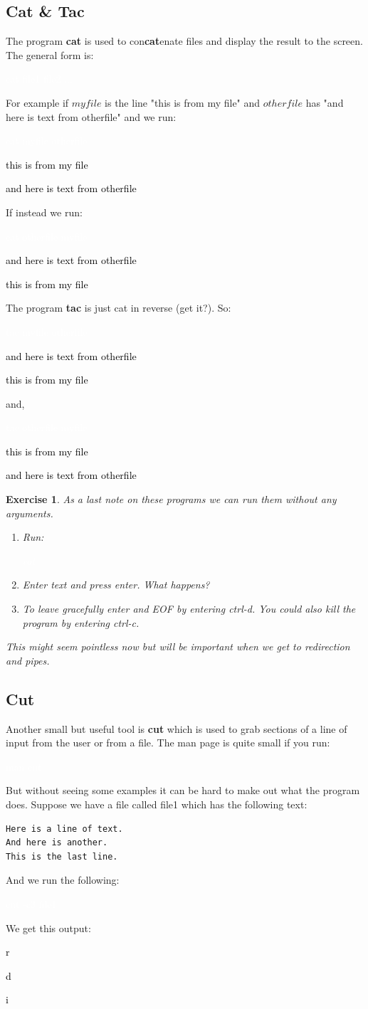 \documentclass[oneside]{book}
\newcommand{\commandline}[1]{\begin{center} \colorbox{Dark}{\textcolor{white}{#1}} \end{center}}
\newcommand{\exampleout}[1]{\begin{center} \colorbox{Light}{\textcolor{black}{#1}} \end{center}}
\newtheorem{ex}{Exercise}[chapter]
\begin{document}
\subsection{Cat \& Tac}
    The program \textbf{cat} is used to con\textbf{cat}enate files and display the result to the screen. The general form is:
    \commandline{cat file1 file2 ...}
    For example if $myfile$ is the line "this is from my file" and $otherfile$ has "and here is text from otherfile" and we run:
    \commandline{cat myfile otherfile}
    \exampleout{this is from my file}
    \exampleout{and here is text from otherfile}
    If instead we run:
    \commandline{cat otherfile myfile}
    \exampleout{and here is text from otherfile}
    \exampleout{this is from my file}
    The program \textbf{tac} is just cat in reverse (get it?). So:
    \commandline{tac myfile otherfile}
    \exampleout{and here is text from otherfile}
    \exampleout{this is from my file}
    and,
    \commandline{tac otherfile myfile}
    \exampleout{this is from my file}
    \exampleout{and here is text from otherfile}
\begin{ex}
    As a last note on these programs we can run them without any arguments. 
    \begin{enumerate}
        \item Run:
            \commandline{cat}
        \item Enter text and press enter. What happens?
        \item To leave gracefully enter and EOF by entering ctrl-d. You could also kill the program by entering ctrl-c. 
    \end{enumerate}
    This might seem pointless now but will be important when we get to redirection and pipes.
\end{ex}

\subsection{Cut}
    Another small but useful tool is \textbf{cut} which is used to grab sections of a line of input from the user or from a file. The man page is quite small if you run:
    \commandline{man cut}
    But without seeing some examples it can be hard to make out what the program does. Suppose we have a file called file1 which has the following text:
    \begin{verbatim}
Here is a line of text.
And here is another.
This is the last line.
    \end{verbatim}
    And we run the following:
    \commandline{cut -c3 file1}
    We get this output:
    \exampleout{r}
    \exampleout{d}
    \exampleout{i}
    
\end{document}
